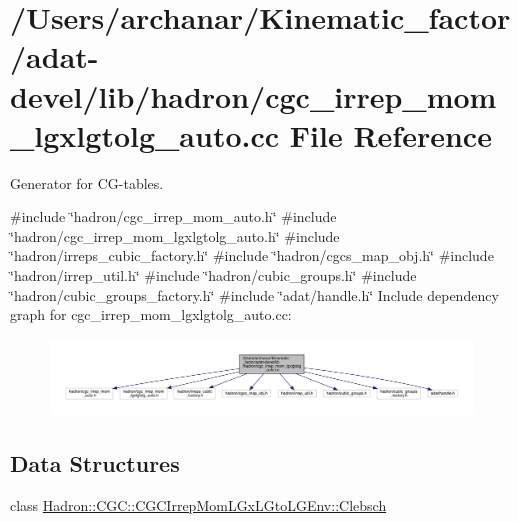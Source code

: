 \hypertarget{adat-devel_2lib_2hadron_2cgc__irrep__mom__lgxlgtolg__auto_8cc}{}\section{/\+Users/archanar/\+Kinematic\+\_\+factor/adat-\/devel/lib/hadron/cgc\+\_\+irrep\+\_\+mom\+\_\+lgxlgtolg\+\_\+auto.cc File Reference}
\label{adat-devel_2lib_2hadron_2cgc__irrep__mom__lgxlgtolg__auto_8cc}


Generator for C\+G-\/tables.  


{\ttfamily \#include \char`\"{}hadron/cgc\+\_\+irrep\+\_\+mom\+\_\+auto.\+h\char`\"{}}\newline
{\ttfamily \#include \char`\"{}hadron/cgc\+\_\+irrep\+\_\+mom\+\_\+lgxlgtolg\+\_\+auto.\+h\char`\"{}}\newline
{\ttfamily \#include \char`\"{}hadron/irreps\+\_\+cubic\+\_\+factory.\+h\char`\"{}}\newline
{\ttfamily \#include \char`\"{}hadron/cgcs\+\_\+map\+\_\+obj.\+h\char`\"{}}\newline
{\ttfamily \#include \char`\"{}hadron/irrep\+\_\+util.\+h\char`\"{}}\newline
{\ttfamily \#include \char`\"{}hadron/cubic\+\_\+groups.\+h\char`\"{}}\newline
{\ttfamily \#include \char`\"{}hadron/cubic\+\_\+groups\+\_\+factory.\+h\char`\"{}}\newline
{\ttfamily \#include \char`\"{}adat/handle.\+h\char`\"{}}\newline
Include dependency graph for cgc\+\_\+irrep\+\_\+mom\+\_\+lgxlgtolg\+\_\+auto.\+cc\+:
\nopagebreak
\begin{figure}[H]
\begin{center}
\leavevmode
\includegraphics[width=350pt]{df/da0/adat-devel_2lib_2hadron_2cgc__irrep__mom__lgxlgtolg__auto_8cc__incl}
\end{center}
\end{figure}
\subsection*{Data Structures}
\begin{DoxyCompactItemize}
\item 
class \mbox{\hyperlink{classHadron_1_1CGC_1_1CGCIrrepMomLGxLGtoLGEnv_1_1Clebsch}{Hadron\+::\+C\+G\+C\+::\+C\+G\+C\+Irrep\+Mom\+L\+Gx\+L\+Gto\+L\+G\+Env\+::\+Clebsch}}
\end{DoxyCompactItemize}
